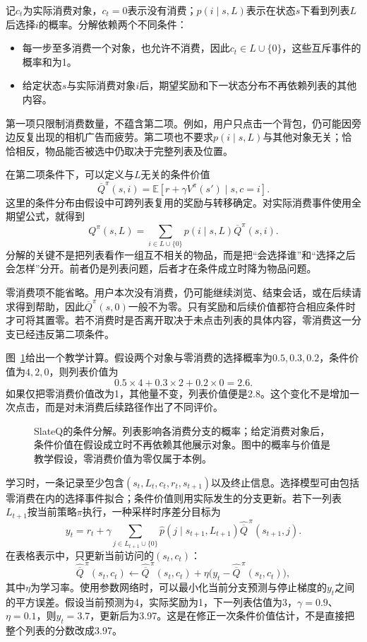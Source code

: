 记$c_t$为实际消费对象，$c_t=0$表示没有消费；$p(i\mid s,L)$表示在状态$s$下看到列表$L$后选择$i$的概率。分解依赖两个不同条件：
\begin{itemize}
 \item 每一步至多消费一个对象，也允许不消费，因此$c_t\in L\cup\{0\}$，这些互斥事件的概率和为1。
 \item 给定状态$s$与实际消费对象$i$后，期望奖励和下一状态分布不再依赖列表的其他内容。
\end{itemize}
第一项只限制消费数量，不蕴含第二项。例如，用户只点击一个背包，仍可能因旁边反复出现的相机广告而疲劳。第二项也不要求$p(i\mid s,L)$与其他对象无关；恰恰相反，物品能否被选中仍取决于完整列表及位置。

在第二项条件下，可以定义与$L$无关的条件价值
\begin{equation}
 \overline Q^\pi(s,i)
 =\mathbb{E}[r+\gamma V^\pi(s')\mid s,c=i].
 \label{eq:rs-slateq-item-value}
\end{equation}
这里的条件分布由假设中可跨列表复用的奖励与转移确定。对实际消费事件使用全期望公式，就得到
\begin{equation}
 Q^\pi(s,L)=
 \sum_{i\in L\cup\{0\}}
 p(i\mid s,L)\overline Q^\pi(s,i).
 \label{eq:rs-slateq-decomposition}
\end{equation}
分解的关键不是把列表看作一组互不相关的物品，而是把“会选择谁”和“选择之后会怎样”分开。前者仍是列表问题，后者才在条件成立时降为物品问题。

零消费项不能省略。用户本次没有消费，仍可能继续浏览、结束会话，或在后续请求得到帮助，因此$\overline Q^\pi(s,0)$一般不为零。只有奖励和后续价值都符合相应条件时才可将其置零。若不消费时是否离开取决于未点击列表的具体内容，零消费这一分支已经违反第二项条件。

图~\ref{fig:rs-long-term-slateq}给出一个教学计算。假设两个对象与零消费的选择概率为$0.5,0.3,0.2$，条件价值为$4,2,0$，则列表价值为
\[
 0.5\times4+0.3\times2+0.2\times0=2.6.
\]
如果仅把零消费价值改为1，其他量不变，列表价值便是2.8。这个变化不是增加一次点击，而是对未消费后续路径作出了不同评价。

\begin{figure}[htbp]
 \centering
 
 \caption{SlateQ的条件分解。列表影响各消费分支的概率；给定消费对象后，条件价值在假设成立时不再依赖其他展示对象。图中的概率与价值是教学假设，零消费价值为零仅属于本例。}
 \label{fig:rs-long-term-slateq}
\end{figure}

学习时，一条记录至少包含$(s_t,L_t,c_t,r_t,s_{t+1})$以及终止信息。选择模型可由包括零消费在内的选择事件拟合；条件价值则用实际发生的分支更新。若下一列表$L_{t+1}$按当前策略$\pi$执行，一种采样时序差分目标为
\[
 y_t=r_t+\gamma
 \sum_{j\in L_{t+1}\cup\{0\}}
 \widehat p(j\mid s_{t+1},L_{t+1})
 \widehat{\overline Q}^{\,\pi}(s_{t+1},j).
\]
在表格表示中，只更新当前访问的$(s_t,c_t)$：
\[
 \widehat{\overline Q}^{\,\pi}(s_t,c_t)
 \leftarrow
 \widehat{\overline Q}^{\,\pi}(s_t,c_t)
 +\eta\bigl(y_t-\widehat{\overline Q}^{\,\pi}(s_t,c_t)\bigr),
\]
其中$\eta$为学习率。使用参数网络时，可以最小化当前分支预测与停止梯度的$y_t$之间的平方误差。假设当前预测为4，实际奖励为1，下一列表估值为3，$\gamma=0.9$、$\eta=0.1$，则$y_t=3.7$，更新后为3.97。这是在修正一次条件价值估计，不是直接把整个列表的分数改成3.97。


